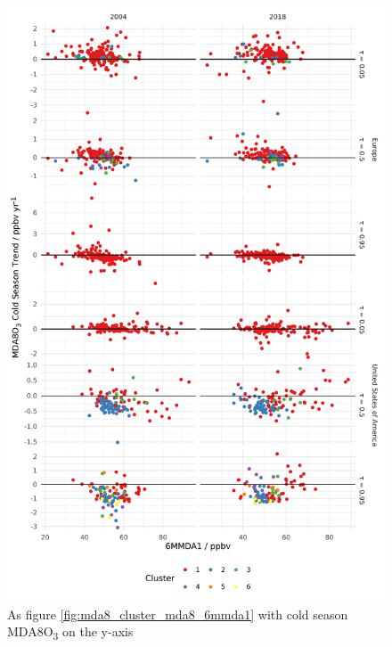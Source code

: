 \documentclass[journal abbreviation, manuscript]{copernicus}
\begin{document}
\begin{figure}[p]
\centering
\includegraphics[height=0.9\textheight]{figures/paper_figures/f15_mda8_cold_cluster_mda8_6mmda1.pdf}
\caption{As figure \ref{fig:mda8_cluster_mda8_6mmda1} with cold season MDA8O\textsubscript{3} on the y-axis}
\label{fig:mda8_cold_cluster_mda8_6mmda1}
\end{figure}
\clearpage



\end{document}
